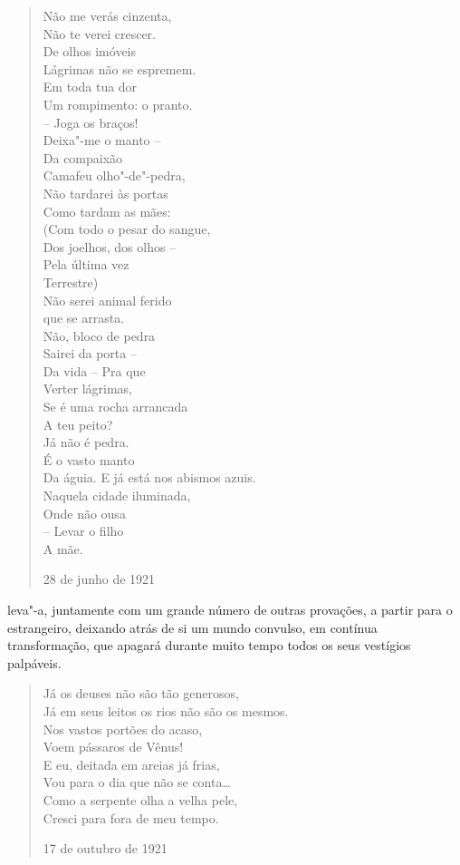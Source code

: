 \begin{verse}
Não me verás cinzenta, \\
Não te verei crescer. \\
De olhos imóveis \\
Lágrimas não se espremem. \\[8pt]
Em toda tua dor \\
Um rompimento: o pranto. \\
-- Joga os braços! \\
Deixa"-me o manto -- \\[8pt]
Da compaixão \\
Camafeu olho"-de"-pedra, \\
Não tardarei às portas \\
Como tardam as mães: \\[8pt]
(Com todo o pesar do sangue, \\
Dos joelhos, dos olhos -- \\
Pela última vez \\
Terrestre) \\
Não serei animal ferido \\
que se arrasta. \\[8pt]
Não, bloco de pedra \\
Sairei da porta -- \\
Da vida -- Pra que \\
Verter lágrimas, \\
Se é uma rocha arrancada \\
A teu peito? \\[8pt]
Já não é pedra. \\
É o vasto manto \\
Da águia. E já está nos abismos azuis. \\
Naquela cidade iluminada, \\
Onde não ousa \\
-- Levar o filho \\
A mãe.

28 de junho de 1921

\end{verse}

leva"-a, juntamente com um grande número de outras provações, a partir
para o estrangeiro, deixando atrás de si um mundo convulso, em contínua
transformação, que apagará durante muito tempo todos os seus vestígios
palpáveis.

\begin{verse}
Já os deuses não são tão generosos, \\
Já em seus leitos os rios não são os mesmos. \\
Nos vastos portões do acaso, \\
Voem pássaros de Vênus! \\[8pt]
E eu, deitada em areias já frias, \\
Vou para o dia que não se conta\ldots{} \\
Como a serpente olha a velha pele, \\
Cresci para fora de meu tempo. 

17 de outubro de 1921

\end{verse}

